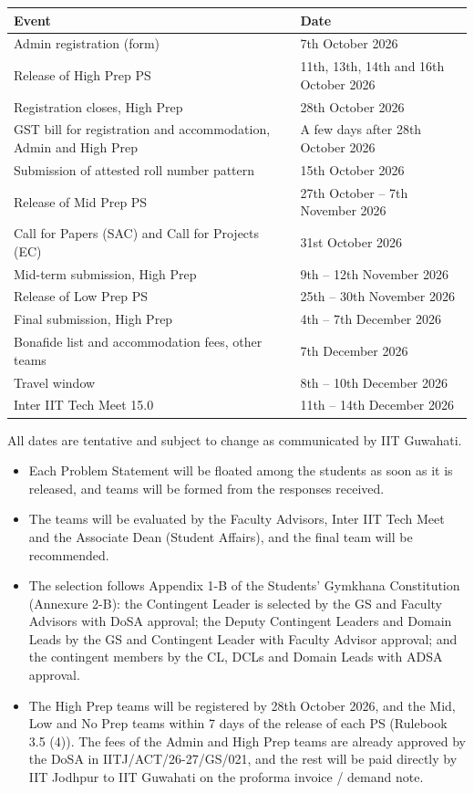 \documentclass[11pt,letterpaper]{article}
\newcommand{\subhead}[1]{\par\needspace{6\baselineskip}{\bfseries #1}\par\nopagebreak}
\begin{document}
\subhead{Important dates (tentative)}
\begin{center}
\begin{tabular}{|L{8.6cm}|L{5cm}|}
\hline
\textbf{Event} & \textbf{Date} \\ \hline
Admin registration (form) & 7th October 2026 \\ \hline
Release of High Prep PS & 11th, 13th, 14th and 16th October 2026 \\ \hline
Registration closes, High Prep & 28th October 2026 \\ \hline
GST bill for registration and accommodation, Admin and High Prep & A few days after 28th October 2026 \\ \hline
Submission of attested roll number pattern & 15th October 2026 \\ \hline
Release of Mid Prep PS & 27th October -- 7th November 2026 \\ \hline
Call for Papers (SAC) and Call for Projects (EC) & 31st October 2026 \\ \hline
Mid-term submission, High Prep & 9th -- 12th November 2026 \\ \hline
Release of Low Prep PS & 25th -- 30th November 2026 \\ \hline
Final submission, High Prep & 4th -- 7th December 2026 \\ \hline
Bonafide list and accommodation fees, other teams & 7th December 2026 \\ \hline
Travel window & 8th -- 10th December 2026 \\ \hline
Inter IIT Tech Meet 15.0 & 11th -- 14th December 2026 \\ \hline
\end{tabular}
\end{center}
{\small All dates are tentative and subject to change as communicated by IIT Guwahati.}

\subhead{Team selection}
\begin{itemize}
  \item Each Problem Statement will be floated among the students as soon as it is released, and teams will be formed from the responses received.
  \item The teams will be evaluated by the Faculty Advisors, Inter IIT Tech Meet and the Associate Dean (Student Affairs), and the final team will be recommended.
  \item The selection follows Appendix 1-B of the Students' Gymkhana Constitution (Annexure 2-B): the Contingent Leader is selected by the GS and Faculty Advisors with DoSA approval; the Deputy Contingent Leaders and Domain Leads by the GS and Contingent Leader with Faculty Advisor approval; and the contingent members by the CL, DCLs and Domain Leads with ADSA approval.
  \item The High Prep teams will be registered by 28th October 2026, and the Mid, Low and No Prep teams within 7 days of the release of each PS (Rulebook 3.5 (4)). The fees of the Admin and High Prep teams are already approved by the DoSA in IITJ/ACT/26-27/GS/021, and the rest will be paid directly by IIT Jodhpur to IIT Guwahati on the proforma invoice / demand note.
\end{itemize}
\end{document}
